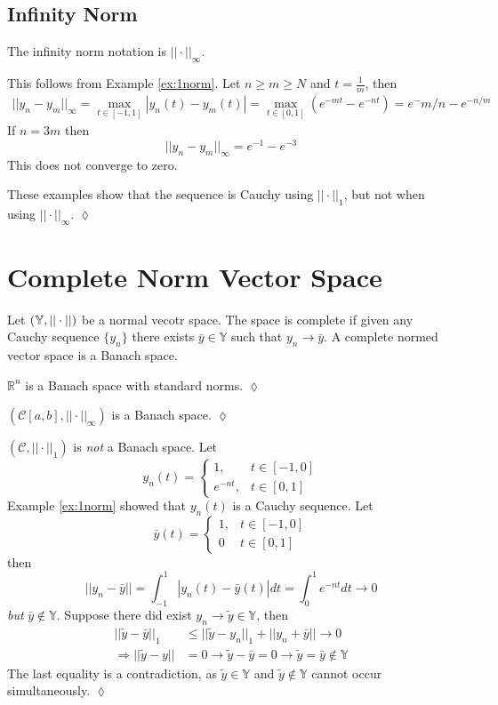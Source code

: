 \documentclass[lecture,12pt,]{pcms-l}
\begin{document}
\subsection{Infinity Norm}
The infinity norm notation is $||\cdot||_\infty$.
\begin{example}
This follows from Example \ref{ex:1norm}. Let $n\geq m\geq N$ and $t=\frac{1}{m}$, then
\begin{align*}
||y_n-y_m||_\infty = \max_{t\in[-1,1]}|y_n(t)-y_m(t)| = \max_{t\in[0,1]}(e^{-mt}-e^{-nt}) = e^-{m/n}-e^{-n/m}
\end{align*}
If $n=3m$ then
$$||y_n-y_m||_\infty = e^{-1}-e^{-3}$$
This does not converge to zero.

These examples show that the sequence is Cauchy using $||\cdot||_1$, but not when using $||\cdot||_\infty$.
$\lozenge$
\end{example}

\section{Complete Norm Vector Space}
\begin{definition}
Let $(\mathbb{Y},||\cdot||)$ be a normal vecotr space. The space is complete if given any Cauchy sequence $\{y_n\}$ there exists $\bar{y}\in\mathbb{Y}$ such that $y_n\to\bar{y}$. A complete normed vector space is a Banach space.
\end{definition}

\begin{example}
$\mathbb{R}^n$ is a Banach space with standard norms.
$\lozenge$
\end{example}

\begin{example}
$(\mathcal{C}[a,b],||\cdot||_\infty)$ is a Banach space.
$\lozenge$
\end{example}

\begin{example}
$(\mathcal{C},||\cdot||_1)$ is \textit{not} a Banach space. Let
$$y_n(t) = \begin{cases} 1, & t\in[-1,0] \\ e^{-nt}, & t\in[0,1] \end{cases}$$
Example \ref{ex:1norm} showed that $y_n(t)$ is a Cauchy sequence. Let
$$\bar{y}(t) = \begin{cases} 1, & t\in[-1,0] \\ 0 & t\in[0,1] \end{cases}$$
then
$$||y_n-\bar{y}|| = \int_{-1}^1|y_n(t)-\bar{y}(t)|dt = \int_0^1e^{-nt}dt\to 0$$
\textit{but} $\bar{y}\notin\mathbb{Y}$. Suppose there did exist $y_n\to\tilde{y}\in\mathbb{Y}$, then
\begin{align*}
||\tilde{y}-\bar{y}||_1 &\leq ||\tilde{y}-y_n||_1+||y_n+\bar{y}||\to 0 \\
\Rightarrow ||\tilde{y}-y|| &= 0 \to \tilde{y}-\bar{y}=0 \to \tilde{y}=\bar{y}\notin\mathbb{Y}
\end{align*}
The last equality is a contradiction, as $\tilde{y}\in\mathbb{Y}$ and $\tilde{y}\notin\mathbb{Y}$ cannot occur simultaneously.
$\lozenge$
\end{example}
\end{document}
